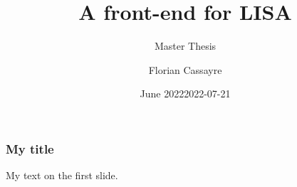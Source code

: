 \documentclass{beamer}
\title[Master Thesis]{A front-end for LISA}
\subtitle{Master Thesis}
\author{Florian Cassayre}
\date{June 2022}
\institute[EPFL]{École polytechnique fédérale de Lausanne}
\date{2022-07-21}
\begin{document}
\frame{\titlepage}

\begin{frame}
\frametitle{My title}
My text on the first slide.
\end{frame}
\end{document}

